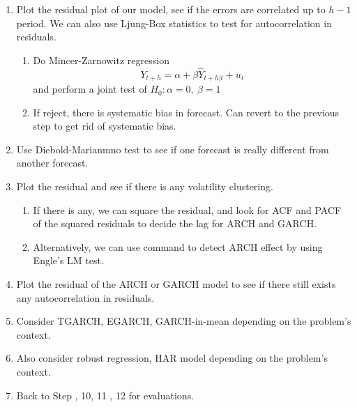 \documentclass{article}
\begin{document}
\begin{enumerate}
\begin{enumerate}
        \end{enumerate}
    \item Plot the residual plot of our model, see if the errors are correlated up to $h-1$ period. We can also use Ljung-Box statistics to test for autocorrelation in residuals.
        \begin{enumerate}
            \item Do Mincer-Zarnowitz regression 
            $$Y_{t+h} = \alpha + \beta \hat{Y}_{t+h|t} + u_t$$ 
            and perform a joint test of $H_0: \alpha = 0,\ \beta = 1$
            \item If reject, there is systematic bias in forecast. Can revert to the previous step to get rid of systematic bias.
        \end{enumerate}
    \item Use Diebold-Marianmno test to see if one forecast is really different from another forecast. 
    \item Plot the residual and see if there is any volatility clustering.
        \begin{enumerate}
            \item If there is any, we can square the residual, and look for ACF and PACF of the squared residuals to decide the lag for ARCH and GARCH.
            \item Alternatively, we can use command to detect ARCH effect by using Engle's LM test.
        \end{enumerate}
    \item Plot the residual of the ARCH or GARCH model to see if there still exists any autocorrelation in residuals.
    \item Consider TGARCH, EGARCH, GARCH-in-mean depending on the problem's context.
    \item Also consider robust regression, HAR model depending on the problem's context.
    \item Back to Step , 10, 11 , 12 for evaluations.

    
\end{enumerate}
\end{document}
